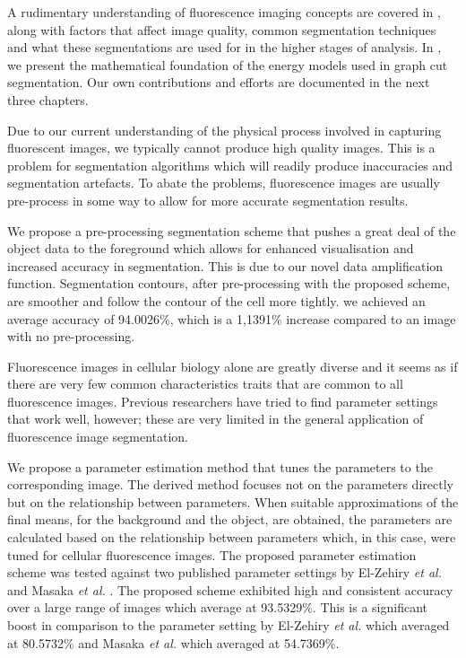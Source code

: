 
A rudimentary understanding of fluorescence imaging concepts are covered in , along with factors that affect image quality, common segmentation techniques and what these segmentations are used for in the higher stages of analysis.
In , we present the mathematical foundation of the energy models used in graph cut segmentation. Our own contributions and efforts are documented in the next three chapters.

\begin{definition}
	Due to our current understanding of the physical process involved in capturing fluorescent images, we typically cannot produce high quality images. This is a problem for segmentation algorithms which will readily produce inaccuracies and segmentation artefacts. To abate the problems, fluorescence images are usually pre-process in some way to allow for more accurate segmentation results.
	
	We propose a pre-processing segmentation scheme that pushes a great deal of the object data to the foreground which allows for enhanced visualisation and increased accuracy in segmentation. This is due to our novel data amplification function. Segmentation contours, after pre-processing with the proposed scheme, are smoother and follow the contour of the cell more tightly. we achieved an average accuracy of 94.0026\%, which is a 1,1391\% increase compared to an image with no pre-processing.
\end{definition}

\begin{definition}
	Fluorescence images in cellular biology alone are greatly diverse and it seems as if there are very few common characteristics traits that are common to all fluorescence images. Previous researchers have tried to find parameter settings that work well, however; these are very limited in the general application of fluorescence image segmentation.
	
	We propose a parameter estimation method that tunes the parameters to the corresponding image. The derived method focuses not on the parameters directly but on the relationship between parameters. When suitable approximations of the final means, for the background and the object, are obtained, the parameters are calculated based on the relationship between parameters which, in this case, were tuned for cellular fluorescence images.
	The proposed parameter estimation scheme was tested against two published parameter settings by El-Zehiry \textit{et al.} \citep{ElZehiry2007} and Masaka \textit{et al.} \citep{Maska2013}.
	The proposed scheme exhibited high and consistent accuracy over a large range of images which average at 93.5329\%. This is a significant boost in comparison to the parameter setting by El-Zehiry \textit{et al.} \citep{ElZehiry2007} which averaged at 80.5732\% and Masaka \textit{et al.} \citep{Maska2013} which averaged at 54.7369\%.
\end{definition}

